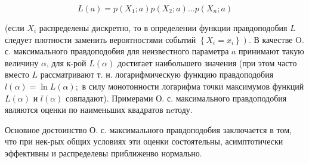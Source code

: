 \documentclass[10pt]{article}
\begin{document}
\[

L(a)=p\left(X_{1} ; a\right) p\left(X_{2} ; a\right) \ldots p\left(X_{n} ; a\right)

\]



(если $X_{i}$ распределены дискретно, то в определении функции правдоподобия $L$ следует плотности заменить вероятностями событий $\left.\left\{X_{i}=x_{i}\right\}\right)$. В качестве O. с. максимального правдоподобия для неизвестного параметра $a$ принимают такую величину $\alpha$, для к-рой $L(\alpha)$ достигает наибольшего значения (при этом часто вместо $L$ рассматривают т. н. логарифмическую функцию правдоподобия $l(\alpha)=\ln L(\alpha) ;$ в силу монотонности логарифма точки максимумов функций $L(\alpha)$ и $l(\alpha)$ совпадают). Примерами О. с. максимального правдоподобия являются оценки по наименьших квадратов neтоду.



Основное достоинство О. с. максимального правдоподобия заключается в том, что при нек-рых общих условиях эти оценки состоятельны, асимптотически эффективны и распределевы приближенво нормально.
\end{document}
